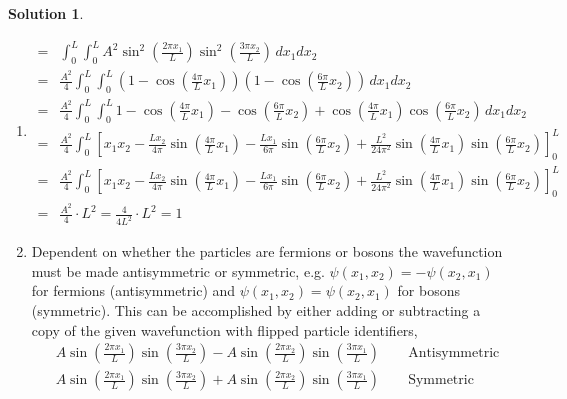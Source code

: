 \documentclass[10pt]{article}
\theoremstyle{definition}
\newtheorem{soln}{Solution}
\begin{document}
\begin{soln}
  \begin{enumerate}[label=(\alph*)]
    \item \begin{align*}
            = & \int_{0}^{L}\int_{0}^{L}A^2\sin^2\left(\frac{2\pi x_1}{L}\right)\sin^2\left(\frac{3\pi x_2}{L}\right)\,dx_1dx_2                                                                             \\
            = & \frac{A^2}{4}\int_{0}^{L}\int_{0}^{L}\left(1-\cos\left(\frac{4\pi}{L}x_1\right)\right)\left(1-\cos\left(\frac{6\pi}{L}x_2\right)\right)\,dx_1dx_2                                           \\
            = & \frac{A^2}{4}\int_{0}^{L}\int_{0}^{L}1-\cos\left(\frac{4\pi}{L}x_1\right)-\cos\left(\frac{6\pi}{L}x_2\right)+\cos\left(\frac{4\pi}{L}x_1\right)\cos\left(\frac{6\pi}{L}x_2\right)\,dx_1dx_2 \\
            = & \frac{A^2}{4}\int_{0}^{L}\left[x_1x_2-\frac{Lx_2}{4\pi}\sin\left(\frac{4\pi}{L}x_1\right)
              -\frac{Lx_1}{6\pi}\sin\left(\frac{6\pi}{L}x_2\right)
              + \frac{L^2}{24\pi^2}\sin\left(\frac{4\pi}{L}x_1\right)\sin\left(\frac{6\pi}{L}x_2\right)
            \right]_0^L                                                                                                                                                                                     \\
            = & \frac{A^2}{4}\int_{0}^{L}\left[x_1x_2-\frac{Lx_2}{4\pi}\sin\left(\frac{4\pi}{L}x_1\right)
              -\frac{Lx_1}{6\pi}\sin\left(\frac{6\pi}{L}x_2\right)
              + \frac{L^2}{24\pi^2}\sin\left(\frac{4\pi}{L}x_1\right)\sin\left(\frac{6\pi}{L}x_2\right)
            \right]_0^L                                                                                                                                                                                     \\
            = & \frac{A^2}{4}\cdot L^2=\frac{4}{4L^2}\cdot L^2=1
          \end{align*}
    \item Dependent on whether the particles are fermions or bosons the wavefunction must be made antisymmetric or symmetric,
          e.g. $\psi(x_1,x_2)=-\psi(x_2,x_1)$ for fermions (antisymmetric) and $\psi(x_1,x_2)=\psi(x_2,x_1)$ for bosons (symmetric).
          This can be accomplished by either adding or subtracting a copy of the given wavefunction with flipped particle identifiers,
          \begin{align*}
             & A\sin\left(\frac{2\pi x_1}{L}\right)\sin\left(\frac{3\pi x_2}{L}\right)-A\sin\left(\frac{2\pi x_2}{L}\right)\sin\left(\frac{3\pi x_1}{L}\right)\qquad\text{Antisymmetric} \\
             & A\sin\left(\frac{2\pi x_1}{L}\right)\sin\left(\frac{3\pi x_2}{L}\right)+A\sin\left(\frac{2\pi x_2}{L}\right)\sin\left(\frac{3\pi x_1}{L}\right)\qquad\text{Symmetric}
          \end{align*}
  \end{enumerate}
\end{soln}
\end{document}
